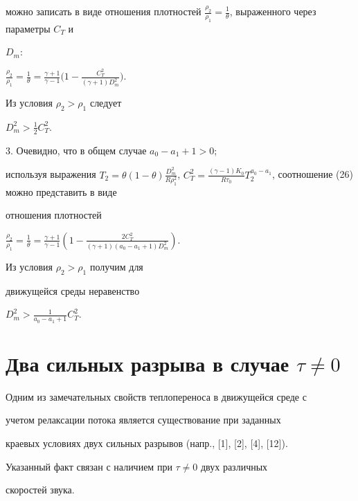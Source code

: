 можно записать в виде отношения плотностей $\frac {\rho _2}{\rho


_1} = \frac {1}{\theta}$, выраженного через параметры $C_T$ и


$D_m$:


$\frac {\rho _2}{\rho _1} = \frac {1}{\theta} = \frac {\gamma +1}{\gamma -


1} \big(1 - \frac {C_T ^2}{(\gamma + 1) D_m ^2}\big)$.


Из условия $\rho _2 > \rho _1$ следует 


$D_m ^2 > \frac {1}{2} C_T ^2$.


\medskip





3. Очевидно, что в общем случае $a_0 - a_1 + 1 > 0$;


используя выражения $T_2 = \theta (1 - \theta) \frac {D_m ^ 2}{R


\rho _1 ^2}$, $C_T ^2 = \frac {(\gamma - 1) K_0}{R \tau _0} T_2


^{a_0 - a_1}$, соотношение (26) можно представить в виде


отношения плотностей


$\frac {\rho _2}{\rho _1} = \frac {1}{\theta} = \frac {\gamma +1}{\gamma -


1} (1 - \frac {2C_T ^2}{(\gamma + 1)(a_0 - a_1 + 1) D_m ^2})$.


Из условия $\rho _2 > \rho _1$ получим для


движущейся среды неравенство


$D_m ^2 > \frac {1}{a_0 - a_1 + 1} C_T^2$.








\section{Два сильных разрыва в случае $\tau \neq0$}





Одним из замечательных свойств теплопереноса в движущейся среде с


учетом релаксации потока является существование при заданных


краевых условиях двух сильных разрывов (напр., [1], [2], [4], [12]).


Указанный факт связан с наличием при $\tau \neq 0$ двух различных


скоростей звука.





